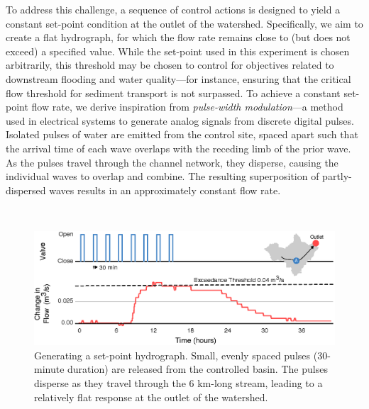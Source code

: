 To address this challenge, a sequence of control actions is designed to yield a constant set-point condition at the outlet of the watershed. Specifically, we aim to create a flat hydrograph, for which the flow rate remains close to (but does not exceed) a specified value. While the set-point used in this experiment is chosen arbitrarily, this threshold may be chosen to control for objectives related to downstream flooding and water quality---for instance, ensuring that the critical flow threshold for sediment transport is not surpassed.
To achieve a constant set-point flow rate, we derive inspiration from \textit{pulse-width modulation}---a method used in electrical systems to generate analog signals from discrete digital pulses. Isolated pulses of water are emitted from the control site, spaced apart such that the arrival time of each wave overlaps with the receding limb of the prior wave. As the pulses travel through the channel network, they disperse, causing the individual waves to overlap and combine. The resulting superposition of partly-dispersed waves results in an approximately constant flow rate.

\

\begin{figure}
    \centering
    \includegraphics[width=\textwidth]{gfx/Chapter-2/Figure7.eps}
    \caption{Generating a set-point hydrograph. Small, evenly spaced pulses (30-minute duration) are released from the controlled basin. The pulses disperse as they travel through the 6 km-long stream, leading to a relatively flat response at the outlet of the watershed.}\label{fig-ch2:5}
\end{figure}

